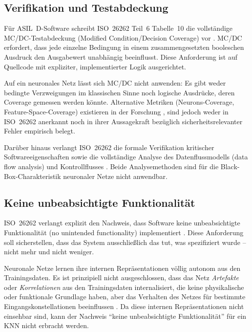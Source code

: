 ﻿\documentclass[12pt,a4paper]{article}
\begin{document}
\subsection{Verifikation und Testabdeckung}
\label{subsec:verifikation}

F\"ur ASIL~D-Software schreibt ISO~26262 Teil~6 Tabelle~10 die vollst\"andige
MC/DC-Testabdeckung (Modified Condition/Decision Coverage) vor
\cite{iso26262_6}. MC/DC erfordert, dass jede einzelne Bedingung in einem
zusammengesetzten booleschen Ausdruck den Ausgabewert unabh\"angig beeinflusst.
Diese Anforderung ist auf Quellcode mit expliziter, implementierter Logik ausgerichtet.

Auf ein neuronales Netz l\"asst sich MC/DC nicht anwenden: Es gibt weder
bedingte Verzweigungen im klassischen Sinne noch logische Ausdr\"ucke, deren
Coverage gemessen werden k\"onnte. Alternative Metriken (Neurons-Coverage,
Feature-Space-Coverage) existieren in der Forschung \cite{Huang2017}, sind
jedoch weder in ISO~26262 anerkannt noch in ihrer Aussagekraft bez\"uglich
sicherheitsrelevanter Fehler empirisch belegt.

Dar\"uber hinaus verlangt ISO~26262 die formale Verifikation kritischer
Softwareeigenschaften sowie die vollst\"andige Analyse des Datenflussmodells
(data flow analysis) und Kontrollflusses \cite{iso26262_6}. Beide Analysemethoden
sind f\"ur die Black-Box-Charakteristik neuronaler Netze nicht anwendbar.

\subsection{Keine unbeabsichtigte Funktionalit\"at}
\label{subsec:kein_unbeabsichtigtes}

ISO~26262 verlangt explizit den Nachweis, dass Software keine unbeabsichtigte
Funktionalit\"at (no unintended functionality) implementiert \cite{iso26262_6}.
Diese Anforderung soll sicherstellen, dass das System ausschlie\ss{}lich das tut,
was spezifiziert wurde -- nicht mehr und nicht weniger.

Neuronale Netze lernen ihre internen Repr\"asentationen v\"ollig autonom aus den
Trainingsdaten. Es ist prinzipiell nicht ausgeschlossen, dass das Netz
\emph{Artefakte} oder \emph{Korrelationen} aus den Trainingsdaten internalisiert,
die keine physikalische oder funktionale Grundlage haben, aber das Verhalten
des Netzes f\"ur bestimmte Eingangskonstellationen beeinflussen
\cite{Goodfellow2015}. Da diese internen Repr\"asentationen nicht
einsehbar sind, kann der Nachweis ``keine unbeabsichtigte Funktionalit\"at''
f\"ur ein KNN nicht erbracht werden.
\end{document}
